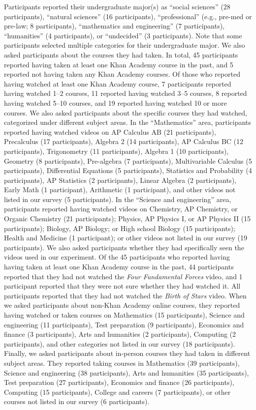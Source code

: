 \documentclass[10pt]{article}
\begin{document}
Participants reported their undergraduate major(s) as ``social sciences'' (28
participants), ``natural sciences'' (16 participants), ``professional'' (e.g., pre-med or pre-law; 8
participants), ``mathematics and engineering'' (7 participants), ``humanities'' (4
participants), or ``undecided'' (3 participants). Note that some participants
selected multiple categories for their undergraduate major. We also asked
participants about the courses they had taken. In total, 45 participants
reported having taken at least one Khan Academy course in the past,
and 5 reported not having taken any Khan
Academy courses. Of those who reported having watched at least one
Khan Academy course, 7 participants reported having watched 1--2 courses, 11
reported having watched 3--5 courses, 8 reported having watched 5--10 courses,
and 19 reported having watched 10 or more courses. We also asked participants
about the specific courses they had watched, categorized under different
subject areas. In the ``Mathematics'' area, participants reported having watched
videos on AP Calculus AB (21 participants), Precalculus (17 participants),
Algebra 2 (14 participants), AP Calculus BC (12 participants), Trigonometry (11
participants), Algebra 1 (10 participants), Geometry (8 participants),
Pre-algebra (7 participants), Multivariable Calculus (5 participants),
Differential Equations (5 participants), Statistics and Probability (4
participants), AP Statistics (2 participants), Linear Algebra (2 participants),
Early Math (1 participant), Arithmetic (1 participant), and other videos not
listed in our survey (5 participants). In the ``Science and engineering'' area,
participants reported having watched videos on Chemistry, AP Chemistry, or
Organic Chemistry (21 participants); Physics, AP Physics I, or AP Physics II (15
participants); Biology, AP Biology; or High school Biology (15 participants);
Health and Medicine (1 participant); or other videos not listed in our survey
(19 participants). We also asked participants whether they had specifically seen the
videos used in our experiment. Of the 45 participants who reported having having
taken at least one Khan Academy course in the past, 44 participants reported that they had not watched the \textit{Four Fundamental Forces} video, and 1 participant reported that they were not sure whether they had watched it. All participants reported that they had not watched the \textit{Birth of Stars} video.
When we asked participants about non-Khan
Academy online courses, they reported having watched or taken courses on
Mathematics (15 participants), Science and engineering (11 participants), Test
preparation (9 participants), Economics and finance (3 participants), Arts and
humanities (2 participants), Computing (2 participants), and other categories
not listed in our survey (18 participants). Finally, we asked participants
about in-person courses they had taken in different subject areas. They
reported taking courses in Mathematics (39 participants), Science and
engineering (38 participants), Arts and humanities (35 participants), Test
preparation (27 participants), Economics and finance (26 participants),
Computing (15 participants), College and careers (7 participants), or other
courses not listed in our survey (6 participants).
\end{document}
